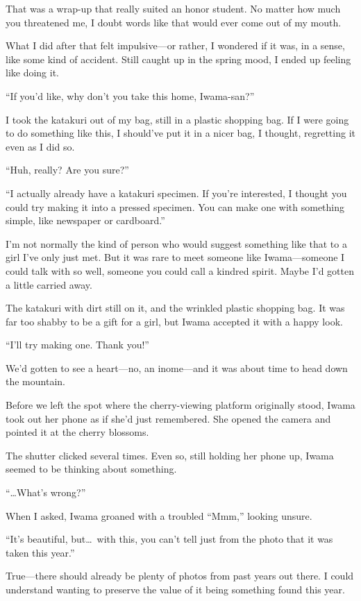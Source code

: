 \documentclass[
    a4paper,
    12pt,
    twoside,
    openany,
    UTF8,
    fontset=windows
]{ctexbook}
\begin{document}
That was a wrap-up that really suited an honor student. No matter how much you threatened me, I doubt words like that would ever come out of my mouth.

What I did after that felt impulsive---or rather, I wondered if it was, in a sense, like some kind of accident. Still caught up in the spring mood, I ended up feeling like doing it.

``If you'd like, why don't you take this home, Iwama-san?''

I took the katakuri out of my bag, still in a plastic shopping bag. If I were going to do something like this, I should've put it in a nicer bag, I thought, regretting it even as I did so.

``Huh, really? Are you sure?''

``I actually already have a katakuri specimen. If you're interested, I thought you could try making it into a pressed specimen. You can make one with something simple, like newspaper or cardboard.''

I'm not normally the kind of person who would suggest something like that to a girl I've only just met. But it was rare to meet someone like Iwama---someone I could talk with so well, someone you could call a kindred spirit. Maybe I'd gotten a little carried away.

The katakuri with dirt still on it, and the wrinkled plastic shopping bag. It was far too shabby to be a gift for a girl, but Iwama accepted it with a happy look.

``I'll try making one. Thank you!''

We'd gotten to see a heart---no, an inome---and it was about time to head down the mountain.

Before we left the spot where the cherry-viewing platform originally stood, Iwama took out her phone as if she'd just remembered. She opened the camera and pointed it at the cherry blossoms.

The shutter clicked several times. Even so, still holding her phone up, Iwama seemed to be thinking about something.

``\dots What's wrong?''

When I asked, Iwama groaned with a troubled ``Mmm,'' looking unsure.

``It's beautiful, but\dots\ with this, you can't tell just from the photo that it was taken this year.''

True---there should already be plenty of photos from past years out there. I could understand wanting to preserve the value of it being something found this year.
\end{document}
